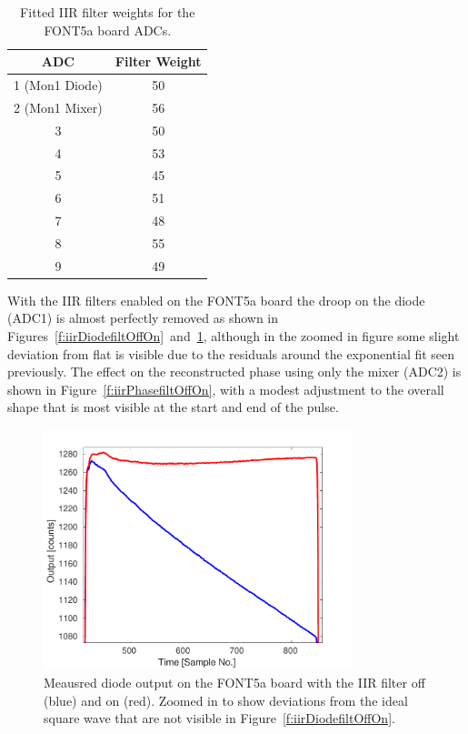 \begin{table}
  \begin{center}
    \begin{tabular}{| c | c |}
	   \hline
       ADC & Filter Weight \\ \hline
       1 (Mon1 Diode) & 50 \\
	   2 (Mon1 Mixer) & 56 \\
	   3 & 50 \\
	   4 & 53 \\
	   5 & 45 \\
	   6 & 51 \\
	   7 & 48 \\
	   8 & 55 \\
	   9 & 49 \\
 	   \hline
    \end{tabular}
    \caption{Fitted IIR filter weights for the FONT5a board ADCs.}
  	\label{t:filtWeights}
  \end{center}
\end{table}

With the IIR filters enabled on the FONT5a board the droop on the diode (ADC1) is almost perfectly removed as shown in Figures~\ref{f:iirDiodefiltOffOn}~and~\ref{f:iirDiodefiltOffOn_zoom}, although in the zoomed in figure some slight deviation from flat is visible due to the residuals around the exponential fit seen previously. The effect on the reconstructed phase using only the mixer (ADC2) is shown in Figure~\ref{f:iirPhasefiltOffOn}, with a modest adjustment to the overall shape that is most visible at the start and end of the pulse.

\begin{figure}
  \centering
  \includegraphics[width=0.8\textwidth]{Figures/commissioning/iirDiodeFiltOffOn_zoom}
  \caption{Meausred diode output on the FONT5a board with the IIR filter off (blue) and on (red). Zoomed in to show deviations from the ideal square wave that are not visible in Figure~\ref{f:iirDiodefiltOffOn}.}
  \label{f:iirDiodefiltOffOn_zoom}
\end{figure}

